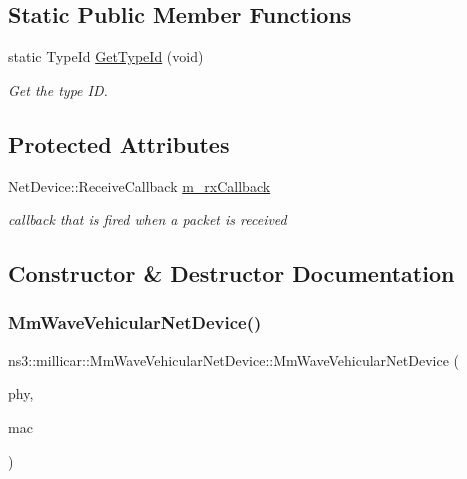 \subsection*{Static Public Member Functions}
\begin{DoxyCompactItemize}
\item 
static Type\+Id \hyperlink{classns3_1_1millicar_1_1MmWaveVehicularNetDevice_a5d96b39b9b59c2daa4068b6a302358fd}{Get\+Type\+Id} (void)
\begin{DoxyCompactList}\small\item\em Get the type ID. \end{DoxyCompactList}\end{DoxyCompactItemize}
\subsection*{Protected Attributes}
\begin{DoxyCompactItemize}
\item 
\mbox{\label{classns3_1_1millicar_1_1MmWaveVehicularNetDevice_a9afc224b7198420bfe70b811809e6337}} 
Net\+Device\+::\+Receive\+Callback \hyperlink{classns3_1_1millicar_1_1MmWaveVehicularNetDevice_a9afc224b7198420bfe70b811809e6337}{m\+\_\+rx\+Callback}
\begin{DoxyCompactList}\small\item\em callback that is fired when a packet is received \end{DoxyCompactList}\end{DoxyCompactItemize}


\subsection{Constructor \& Destructor Documentation}
\mbox{\label{classns3_1_1millicar_1_1MmWaveVehicularNetDevice_a45198022453e183d1d0337cd6871d24d}} 
\subsubsection{\texorpdfstring{Mm\+Wave\+Vehicular\+Net\+Device()}{MmWaveVehicularNetDevice()}}
{\footnotesize\ttfamily ns3\+::millicar\+::\+Mm\+Wave\+Vehicular\+Net\+Device\+::\+Mm\+Wave\+Vehicular\+Net\+Device (\begin{DoxyParamCaption}\item[{Ptr$<$ \hyperlink{classns3_1_1millicar_1_1MmWaveSidelinkPhy}{Mm\+Wave\+Sidelink\+Phy} $>$}]{phy,  }\item[{Ptr$<$ \hyperlink{classns3_1_1millicar_1_1MmWaveSidelinkMac}{Mm\+Wave\+Sidelink\+Mac} $>$}]{mac }\end{DoxyParamCaption})}



